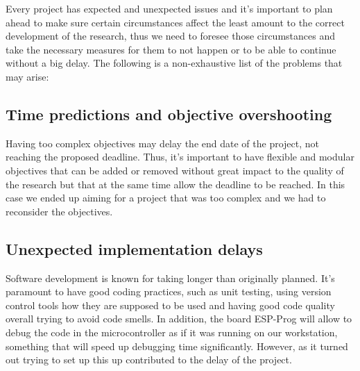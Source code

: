 Every project has expected and unexpected issues and it's important to plan ahead to make sure certain circumstances affect the least amount to the correct development of the research, thus we need to foresee those circumstances and take the necessary measures for them to not happen or to be able to continue without a big delay. The following is a non-exhaustive list of the problems that may arise:
\subsection{Time predictions and objective overshooting}
Having too complex objectives may delay the end date of the project, not reaching the proposed deadline. Thus, it's important to have flexible and modular objectives that can be added or removed without great impact to the quality of the research but that at the same time allow the deadline to be reached. In this case we ended up aiming for a project that was too complex and we had to reconsider the objectives.

\subsection{Unexpected implementation delays}
Software development is known for taking longer than originally planned. It's paramount to have good coding practices, such as unit testing, using version control tools how they are supposed to be used and having good code quality overall trying to avoid code smells. In addition, the board ESP-Prog will allow to debug the code in the microcontroller as if it was running on our workstation, something that will speed up debugging time significantly. However, as it turned out trying to set up this up contributed to the delay of the project.
